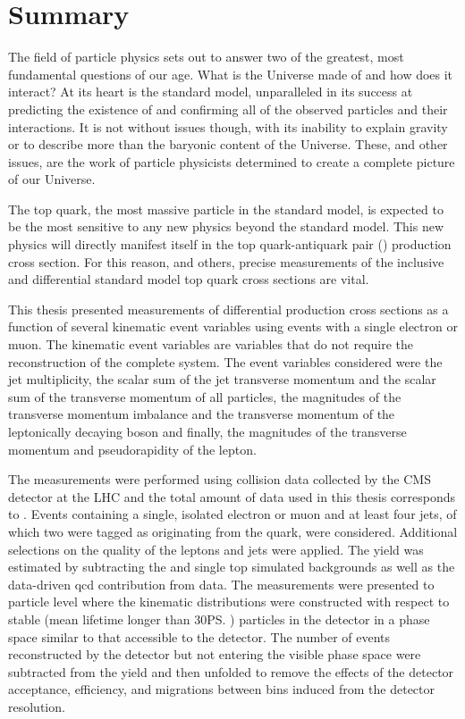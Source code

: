 \chapter*{Summary}
\label{ch:summary}

The field of particle physics sets out to answer two of the greatest, most fundamental questions of our age.
What is the Universe made of and how does it interact?
At its heart is the standard model, unparalleled in its success at predicting the existence of and confirming all of the observed particles and their interactions.
It is not without issues though, with its inability to explain gravity or to describe more than the baryonic content of the Universe.
These, and other issues, are the work of particle physicists determined to create a complete picture of our Universe.

The top quark, the most massive particle in the standard model, is expected to be the most sensitive to any new physics beyond the standard model.
This new physics will directly manifest itself in the top quark-antiquark pair (\ttbar{}) production cross section.
For this reason, and others, precise measurements of the inclusive and differential standard model top quark cross sections are vital.

This thesis presented measurements of differential \ttbar{} production cross sections as a function of several kinematic event variables using events with a single electron or muon.
The kinematic event variables are variables that do not require the reconstruction of the complete \ttbar{} system.
The event variables considered were the jet multiplicity, the scalar sum of the jet transverse momentum and the scalar sum of the transverse momentum of all particles, the magnitudes of the transverse momentum imbalance and the transverse momentum of the leptonically decaying \Wboson{} boson and finally, the magnitudes of the transverse momentum and pseudorapidity of the lepton.

The measurements were performed using collision data collected by the CMS detector at the LHC and the total amount of data used in this thesis corresponds to \Lumi.
Events containing a single, isolated electron or muon and at least four jets, of which two were tagged as originating from the \bquark{} quark, were considered.
Additional selections on the quality of the leptons and jets were applied.
The \ttbar{} yield was estimated by subtracting the \Vjets{} and single top simulated backgrounds as well as the data-driven \acrshort{qcd} contribution from data.
The measurements were presented to particle level where the kinematic distributions were constructed with respect to stable (mean lifetime longer than 30\ps{}) particles in the detector in a phase space similar to that accessible to the detector.
The number of events reconstructed by the detector but not entering the visible phase space were subtracted from the \ttbar{} yield and then unfolded to remove the effects of the detector acceptance, efficiency, and migrations between bins induced from the detector resolution. 


